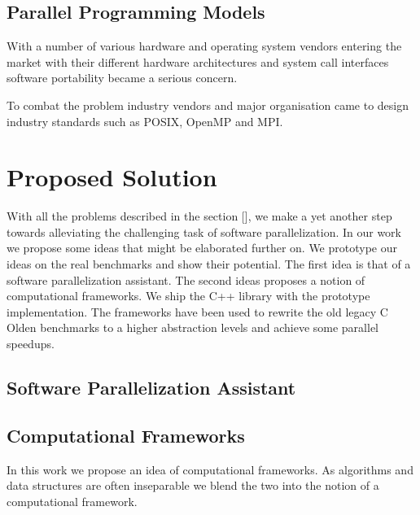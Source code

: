 \subsection{Parallel Programming Models}
\quad With a number of various hardware and operating system vendors entering the market with their different hardware architectures and system call interfaces software portability became a serious concern.   



To combat the problem industry vendors and major organisation came to design industry standards such as POSIX, OpenMP and MPI. 

\section{Proposed Solution}
\quad With all the problems described in the section [], we make a yet another step towards alleviating the challenging task of software parallelization. In our work we propose some ideas that might be elaborated further on. We prototype our ideas on the real benchmarks and show their potential. The first idea is that of a software parallelization assistant. The second ideas proposes a notion of computational frameworks. We ship the C++ library with the prototype implementation. The frameworks have been used to rewrite the old legacy C Olden benchmarks to a higher abstraction levels and achieve some parallel speedups.
\subsection{Software Parallelization Assistant}

\subsection{Computational Frameworks}
\quad In this work we propose an idea of computational frameworks. As algorithms and data structures are often inseparable we blend the two into the notion of a computational framework.  


